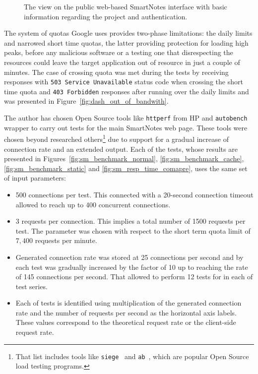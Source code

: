 \begin{figure}[ht]
\begin{center}
  \end{center}
  \caption{The view on the public web-based SmartNotes interface with basic information regarding the project and authentication.}
  \label{fig:sn_dash_view}
\end{figure}
The system of quotas Google uses provides two-phase limitations: the daily limits and narrowed short time quotas, the latter providing protection for loading high peaks, before any malicious software or a testing one that disrespecting the resources could leave the target application out of resource in just a couple of minutes. The case of crossing quota was met during the tests by receiving responses with \texttt{503 Service Unavailable} status code when crossing the short time quota and \texttt{403 Forbidden} responses after running over the daily limits and was presented in Figure~\ref{fig:dash_out_of_bandwith}.
 
The author has chosen Open Source tools like \texttt{httperf} from HP and \texttt{autobench} wrapper to carry out tests for the main SmartNotes web page. These tools were chosen beyond researched others\footnote{That list includes tools like \texttt{siege}~\cite{siege_tool} and \texttt{ab}~\cite{ab_tool}, which are popular Open Source load testing programs.} due to support for a gradual increase of connection rate and an extended output. Each of the tests, whose results are presented in Figures~\ref{fig:sm_benchmark_normal}, \ref{fig:sm_benchmark_cache}, \ref{fig:sm_benchmark_static} and \ref{fig:sm_resp_time_comapre}, uses the same set of input parameters:
\begin{itemize}
              \item{500 connections per test. This connected with a 20-second connection timeout allowed to reach up to 400 concurrent connections.  }
              \item{3 requests per connection. This implies a total number of 1500 requests per test. The parameter was chosen with respect to the short term quota limit of $7, 400$ requests per minute.}
              \item{Generated connection rate was stored at 25 connections per second and by each test was gradually increased by the factor of 10 up to reaching the rate of 145 connections per second. That allowed to perform 12 tests for in each of test series.}
              \item{Each of tests is identified using multiplication of the generated connection rate and the number of requests per second as the horizontal axis labels. These values correspond to the theoretical request rate or the client-side request rate.}
\end{itemize}
 
